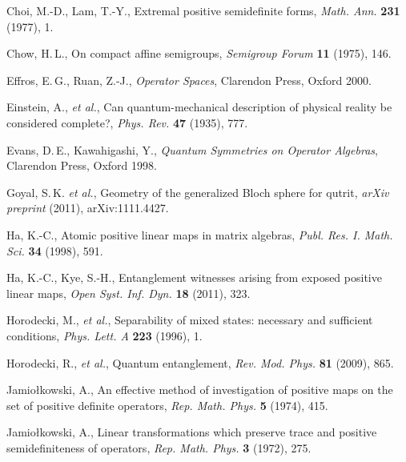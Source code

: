 {\begin{thebibliography}{99}
    Choi, M.-D., Lam, T.-Y.,
    Extremal positive semidefinite forms,
    \emph{Math. Ann.} {\bf 231} (1977), 1.

    Chow, H.\,L.,
    On compact affine semigroups,
    \emph{Semigroup Forum} {\bf 11} (1975), 146.



    Effros, E.\,G., Ruan, Z.-J., \emph{Operator Spaces}, Clarendon Press, Oxford 2000.

    Einstein, A., \emph{et al.},
    Can quantum-mechanical description of physical reality be considered complete?,
    \emph{Phys. Rev.} {\bf 47} (1935), 777.

    Evans, D.\,E., Kawahigashi, Y.,
    \emph{Quantum Symmetries on Operator Algebras}, Clarendon Press, Oxford 1998.

    Goyal, S.\,K. \emph{et al.},
    Geometry of the generalized Bloch sphere for qutrit,
    \emph{arXiv preprint} (2011), arXiv:1111.4427.

    Ha, K.-C.,
    Atomic positive linear maps in matrix algebras,
    \emph{Publ. Res. I. Math. Sci.} {\bf 34} (1998), 591.

    Ha, K.-C., Kye, S.-H.,
    Entanglement witnesses arising from exposed positive linear maps,
    \emph{Open Syst. Inf. Dyn.} {\bf 18} (2011), 323.

      Horodecki, M., \emph{et al.},
      Separability of mixed states: necessary and sufficient conditions,
      \emph{Phys. Lett. A} {\bf 223} (1996), 1.

    Horodecki, R., \emph{et al.},
    Quantum entanglement,
    \emph{Rev. Mod. Phys.} {\bf 81} (2009), 865.

      Jamio{\l}kowski, A.,
      An effective method of investigation of positive maps on the set of positive definite operators,
      \emph{Rep. Math. Phys.} {\bf 5} (1974), 415.

    Jamio{\l}kowski, A.,
    Linear transformations which preserve trace and positive semidefiniteness of operators,
    \emph{Rep. Math. Phys.} {\bf 3} (1972), 275.


\end{thebibliography}}
